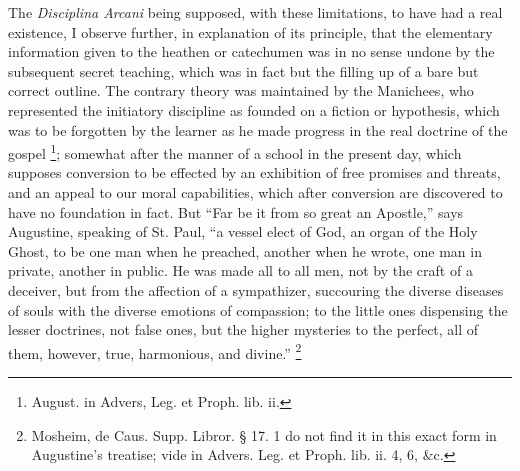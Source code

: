 The \emph{Disciplina Arcani} being supposed, with these
limitations, to have had a real existence, I observe further, in
explanation of its principle, that the elementary information given to
the heathen or catechumen was in no sense undone by the subsequent
secret teaching, which was in fact but the filling up of a bare but
correct outline. The contrary theory was maintained by the Manichees,
who represented the initiatory discipline as founded on a fiction or
hypothesis, which was to be forgotten by the learner as he made
progress in the real doctrine of the gospel \footnote{August. in Advers, Leg. et Proph. lib. ii.}; somewhat after the manner of a school in the present day,
which supposes conversion to be effected by an exhibition of free
promises and threats, and an appeal to our moral capabilities, which
after conversion are discovered to have no foundation in fact. But
``Far be it from so great an Apostle,'' says Augustine,
speaking of St. Paul, ``a vessel elect of God, an organ of the
Holy Ghost, to be one man when he preached, another when he wrote, one
man in private, another in public. He was made all to all men, not by
the craft of a deceiver, but from the affection of a sympathizer,
succouring the diverse diseases of souls with the diverse emotions of
compassion; to the little ones dispensing the lesser doctrines, not
false ones, but the higher mysteries to the perfect, all of them,
however, true, harmonious, and divine.'' \footnote{Mosheim, de Caus. Supp. Libror. § 17. 1
do not find it in this exact form in Augustine's treatise; vide in
Advers. Leg. et Proph. lib. ii. 4, 6, \&c.}

